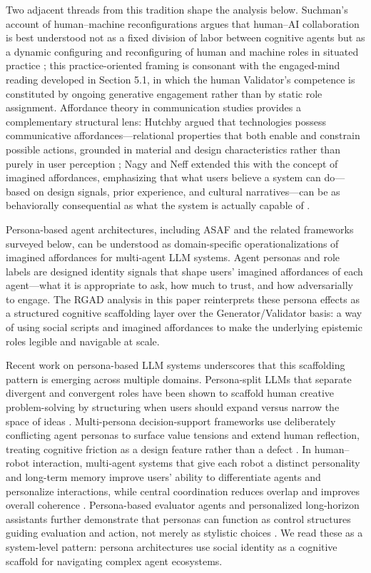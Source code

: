 \documentclass[11pt,a4paper]{article}
\begin{document}
Two adjacent threads from this tradition shape the analysis below. Suchman's account of human--machine reconfigurations argues that human--AI collaboration is best understood not as a fixed division of labor between cognitive agents but as a dynamic configuring and reconfiguring of human and machine roles in situated practice \citep{suchman2007}; this practice-oriented framing is consonant with the engaged-mind reading developed in Section 5.1, in which the human Validator's competence is constituted by ongoing generative engagement rather than by static role assignment. Affordance theory in communication studies provides a complementary structural lens: Hutchby argued that technologies possess communicative affordances---relational properties that both enable and constrain possible actions, grounded in material and design characteristics rather than purely in user perception \citep{hutchby2001}; Nagy and Neff extended this with the concept of imagined affordances, emphasizing that what users believe a system can do---based on design signals, prior experience, and cultural narratives---can be as behaviorally consequential as what the system is actually capable of \citep{nagy2015}.

Persona-based agent architectures, including ASAF \citep{lee2026} and the related frameworks surveyed below, can be understood as domain-specific operationalizations of imagined affordances for multi-agent LLM systems. Agent personas and role labels are designed identity signals that shape users' imagined affordances of each agent---what it is appropriate to ask, how much to trust, and how adversarially to engage. The RGAD analysis in this paper reinterprets these persona effects as a structured cognitive scaffolding layer over the Generator/Validator basis: a way of using social scripts and imagined affordances to make the underlying epistemic roles legible and navigable at scale.

Recent work on persona-based LLM systems underscores that this scaffolding pattern is emerging across multiple domains. Persona-split LLMs that separate divergent and convergent roles have been shown to scaffold human creative problem-solving by structuring when users should expand versus narrow the space of ideas \citep{epperson2025}. Multi-persona decision-support frameworks use deliberately conflicting agent personas to surface value tensions and extend human reflection, treating cognitive friction as a design feature rather than a defect \citep{kumar2025}. In human--robot interaction, multi-agent systems that give each robot a distinct personality and long-term memory improve users' ability to differentiate agents and personalize interactions, while central coordination reduces overlap and improves overall coherence \citep{alami2026}. Persona-based evaluator agents and personalized long-horizon assistants further demonstrate that personas can function as control structures guiding evaluation and action, not merely as stylistic choices \citep{li2025, zhang2025}. We read these as a system-level pattern: persona architectures use social identity as a cognitive scaffold for navigating complex agent ecosystems.
\end{document}
